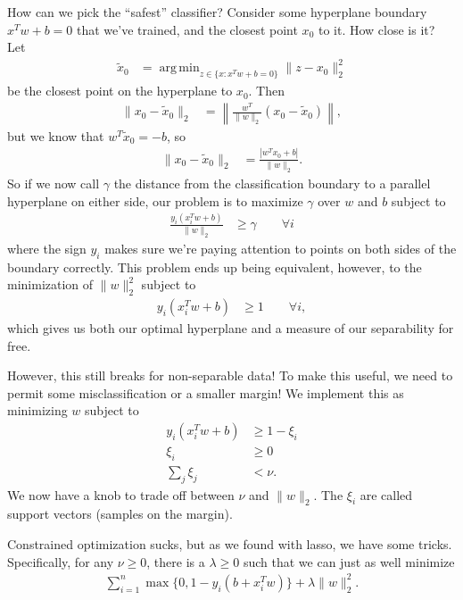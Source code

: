 \documentclass[11pt,letterpaper]{article}
\DeclareMathOperator*{\argmin}{arg\,min}
\theoremstyle{definition}
\numberwithin{equation}{section}
\numberwithin{figure}{section}
\begin{document}
How can we pick the ``safest'' classifier? Consider some hyperplane boundary $x^T w + b = 0$ that we've trained, and the closest point $x_0$ to it. How close is it? Let
%
\begin{align}
	\tilde{x}_0 &= \argmin_{z \in \{x : x^T w + b = 0\}} \|z - x_0 \|_2^2
\end{align}
%
be the closest point on the hyperplane to $x_0$. Then
%
\begin{align}
	\|x_0 - \tilde{x}_0\|_2 &= \left\|\frac{w^T}{\|w\|_2} (x_0-\tilde{x}_0)\right\|,
\end{align}
%
but we know that $w^T \tilde{x}_0 = -b$, so
%
\begin{align}
	\|x_0 - \tilde{x}_0\|_2 &= \frac{|w^T x_0 + b|}{\|w\|_2}.
\end{align}
%
So if we now call $\gamma$ the distance from the classification boundary to a parallel hyperplane on either side, our problem is to maximize $\gamma$ over $w$ and $b$ subject to
%
\begin{align}
	\frac{y_i(x_i^T w + b)}{\|w\|_2} &\geq \gamma \qquad \forall i
\end{align}
%
where the sign $y_i$ makes sure we're paying attention to points on both sides of the boundary correctly. This problem ends up being equivalent, however, to the minimization of $\|w\|_2^2$ subject to
%
\begin{align}
	y_i\left(x_i^T w + b\right) & \geq 1 \qquad \forall i,
\end{align}
%
which gives us both our optimal hyperplane and a measure of our separability for free.




However, this still breaks for non-separable data! To make this useful, we need to permit some misclassification or a smaller margin! We implement this as minimizing $w$ subject to
%
\begin{align}
	y_i(x_i^T w + b) &\geq 1 -\xi_i\\
	\xi_i &\geq 0\\
	\sum_j \xi_j &< \nu.
\end{align}
%
We now have a knob to trade off between $\nu$ and $\|w\|_2$. The $\xi_i$ are called support vectors (samples on the margin).

Constrained optimization sucks, but as we found with lasso, we have some tricks. Specifically, for any $\nu \geq 0$, there is a $\lambda \geq 0$ such that we can just as well minimize
%
\begin{align}
	\sum_{i=1}^n \max\{0, 1 - y_i(b + x_i^T w)\} + \lambda \|w\|_2^2.
\end{align}
\end{document}
